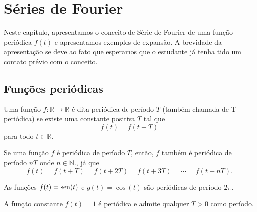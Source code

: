 
%
\chapter{Séries de Fourier} %

Neste capítulo, apresentamos o conceito de Série de Fourier de uma função periódica $f(t)$ e apresentamos exemplos de expansão. A brevidade da apresentação se deve ao fato que esperamos que o estudante já tenha tido um contato prévio com o conceito.
\section{Funções periódicas}
\begin{defn} Uma função $f:\mathbb{R}\to\mathbb{R}$ é dita periódica de período $T$ (também chamada de T-periódica) se existe uma constante positiva $T$ tal que
$$f(t)=f(t+T)$$
para todo $t\in\mathbb{R}.$
\end{defn}

\begin{obs} Se uma função $f$ é periódica de período $T$, então, $f$ também é periódica de período $nT$ onde $n\in\mathbb{N}.$, já que
$$f(t)=f(t+T)=f(t+2T)=f(t+3T)=\cdots =f(t+nT).$$
 \end{obs}
 
 \begin{ex}
  As funções $f(t)=\operatorname{sen}(t)$ e $g(t)=\cos(t)$ são periódicas de período $2\pi$.
 \end{ex}
\begin{ex}
  A função constante $f(t)=1$ é periódica e admite qualquer $T>0$ como período.
 \end{ex}

